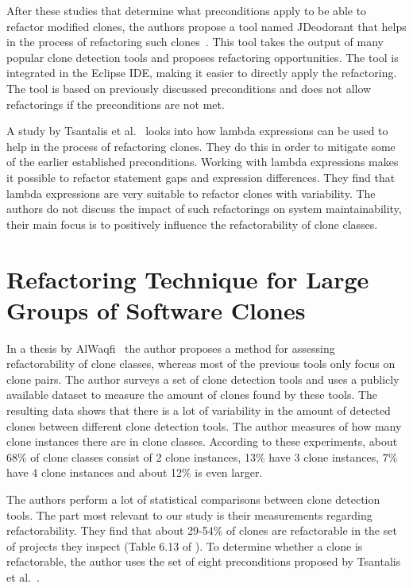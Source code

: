 After these studies that determine what preconditions apply to be able to refactor modified clones, the authors propose a tool named JDeodorant that helps in the process of refactoring such clones~\cite{mazinanian2016jdeodorant}. This tool takes the output of many popular clone detection tools \cite{kamiya2002ccfinder, deissenboeck2010flexible, jiang2007deckard, cordy2011nicad} and proposes refactoring opportunities. The tool is integrated in the Eclipse IDE, making it easier to directly apply the refactoring. The tool is based on previously discussed preconditions and does not allow refactorings if the preconditions are not met.

A study by Tsantalis et al.~\cite{tsantalis2017clone} looks into how lambda expressions can be used to help in the process of refactoring clones. They do this in order to mitigate some of the earlier established preconditions. Working with lambda expressions makes it possible to refactor statement gaps and expression differences. They find that lambda expressions are very suitable to refactor clones with variability. The authors do not discuss the impact of such refactorings on system maintainability, their main focus is to positively influence the refactorability of clone classes.

\section{Refactoring Technique for Large Groups of Software Clones}
In a thesis by AlWaqfi~\cite{alwaqfi2017refactoring} the author proposes a method for assessing refactorability of clone classes, whereas most of the previous tools only focus on clone pairs. The author surveys a set of clone detection tools \cite{kamiya2002ccfinder, baxter1999clonedr, jiang2007deckard, cordy2011nicad} and uses a publicly available dataset \cite{tsantalis2015assessing} to measure the amount of clones found by these tools. The resulting data shows that there is a lot of variability in the amount of detected clones between different clone detection tools. The author measures of how many clone instances there are in clone classes. According to these experiments, about 68\% of clone classes consist of 2 clone instances, 13\% have 3 clone instances, 7\% have 4 clone instances and about 12\% is even larger.

The authors perform a lot of statistical comparisons between clone detection tools. The part most relevant to our study is their measurements regarding refactorability. They find that about 29-54\% of clones are refactorable in the set of projects they inspect (Table 6.13 of \cite{alwaqfi2017refactoring}). To determine whether a clone is refactorable, the author uses the set of eight preconditions proposed by Tsantalis et al.~\cite{tsantalis2015assessing}.


